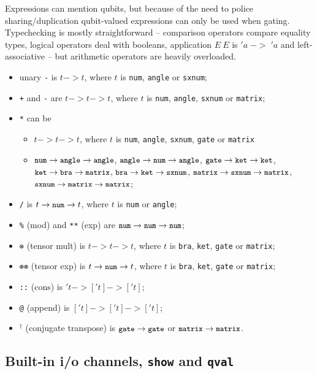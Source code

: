 \documentclass[11pt,a4paper]{article}
\newcommand{\verbtt}[1]{\texttt{\small{}#1}}
\begin{document}
Expressions can mention qubits, but because of the need to police sharing/duplication qubit-valued expressions can only be used when gating. Typechecking is mostly straightforward -- comparison operators compare equality types, logical operators deal with booleans, application $E\ E$ is $'a\;->\;'a$ and left-associative -- but arithmetic operators are heavily overloaded.
\begin{itemize}
\item unary \verbtt{-} is $t->t$, where $t$ is \verbtt{num}, \verbtt{angle} or \verbtt{sxnum};
\item \verbtt{+} and \verbtt{-} are $t->t->t$, where $t$ is \verbtt{num}, \verbtt{angle}, \verbtt{sxnum} or \verbtt{matrix};
\item \verbtt{*} can be 
\begin{itemize}
	\item $t->t->t$, where $t$ is \verbtt{num}, \verbtt{angle}, \verbtt{sxnum}, \verbtt{gate} or \verbtt{matrix}
	\item $\verbtt{num}->\verbtt{angle}->\verbtt{angle}$, $\verbtt{angle}->\verbtt{num}->\verbtt{angle}$, $\verbtt{gate}->\verbtt{ket}->\verbtt{ket}$, $\verbtt{ket}->\verbtt{bra}->\verbtt{matrix}$, $\verbtt{bra}->\verbtt{ket}->\verbtt{sxnum}$, $\verbtt{matrix}->\verbtt{sxnum}->\verbtt{matrix}$, $\verbtt{sxnum}->\verbtt{matrix}->\verbtt{matrix}$;
\end{itemize}
\item \verbtt{/} is $t->\verbtt{num}->t$, where $t$ is \verbtt{num} or \verbtt{angle};
\item \verbtt{\%} (mod) and \verbtt{**} (exp) are $\verbtt{num}->\verbtt{num}->\verbtt{num}$;
\item \verbtt{⊗} (tensor mult) is $t->t->t$, where $t$ is \verbtt{bra}, \verbtt{ket}, \verbtt{gate} or \verbtt{matrix};
\item \verbtt{⊗⊗} (tensor exp) is $t->\verbtt{num}->t$, where $t$ is \verbtt{bra}, \verbtt{ket}, \verbtt{gate} or \verbtt{matrix};
\item \verbtt{::} (cons) is $'t->['t]->['t]$;
\item \verbtt{@} (append) is $['t]->['t]->['t]$;
\item \ensuremath{^{\dag}} (conjugate transpose) is $\verbtt{gate}->\verbtt{gate}$ or $\verbtt{matrix}->\verbtt{matrix}$.
\end{itemize}


\subsection{Built-in i/o channels, \verbtt{show} and \verbtt{qval}}
\end{document}
